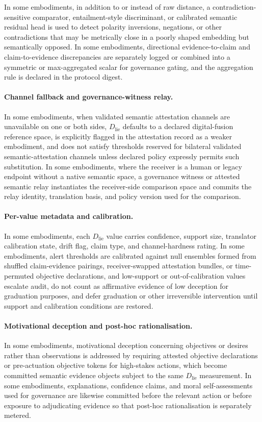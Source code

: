 \documentclass[a4paper,12pt]{article}
\begin{document}
In some embodiments, in addition to or instead of raw distance, a
contradiction-sensitive comparator, entailment-style discriminant, or
calibrated semantic residual head is used to detect polarity
inversions, negations, or other contradictions that may be metrically
close in a poorly shaped embedding but semantically opposed. In some
embodiments, directional evidence-to-claim and claim-to-evidence
discrepancies are separately logged or combined into a symmetric or
max-aggregated scalar for governance gating, and the aggregation rule
is declared in the protocol digest.

\paragraph{Channel fallback and governance-witness relay.}
In some embodiments, when validated semantic attestation channels are
unavailable on one or both sides, $D_{\mathrm{lie}}$ defaults to a
declared digital-fusion reference space, is explicitly flagged in the
attestation record as a weaker embodiment, and does not satisfy
thresholds reserved for bilateral validated semantic-attestation
channels unless declared policy expressly permits such substitution.
In some embodiments, where the receiver is a human or legacy endpoint
without a native semantic space, a governance witness or attested
semantic relay instantiates the receiver-side comparison space and
commits the relay identity, translation basis, and policy version used
for the comparison.

\paragraph{Per-value metadata and calibration.}
In some embodiments, each $D_{\mathrm{lie}}$ value carries confidence,
support size, translator calibration state, drift flag, claim type,
and channel-hardness rating. In some embodiments, alert thresholds are
calibrated against null ensembles formed from shuffled claim-evidence
pairings, receiver-swapped attestation bundles, or time-permuted
objective declarations, and low-support or out-of-calibration values
escalate audit, do not count as affirmative evidence of low deception
for graduation purposes, and defer graduation or other irreversible
intervention until support and calibration conditions are restored.

\paragraph{Motivational deception and post-hoc rationalisation.}
In some embodiments, motivational deception concerning objectives or
desires rather than observations is addressed by requiring attested
objective declarations or pre-actuation objective tokens for
high-stakes actions, which become committed semantic evidence objects
subject to the same $D_{\mathrm{lie}}$ measurement. In some
embodiments, explanations, confidence claims, and moral
self-assessments used for governance are likewise committed before the
relevant action or before exposure to adjudicating evidence so that
post-hoc rationalisation is separately metered.
\end{document}
